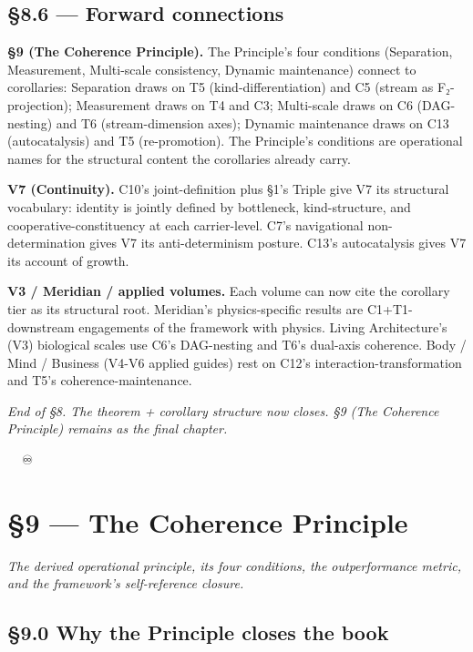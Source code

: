 \documentclass[11pt, openany]{book}
\newcommand{\sectionbreak}{\clearpage}
\begin{document}
\sectionbreak

\section{§8.6 --- Forward connections}

\textbf{§9 (The Coherence Principle).} The Principle's four conditions (Separation, Measurement, Multi-scale consistency, Dynamic maintenance) connect to corollaries: Separation draws on T5 (kind-differentiation) and C5 (stream as F₂-projection); Measurement draws on T4 and C3; Multi-scale draws on C6 (DAG-nesting) and T6 (stream-dimension axes); Dynamic maintenance draws on C13 (autocatalysis) and T5 (re-promotion). The Principle's conditions are operational names for the structural content the corollaries already carry.

\textbf{V7 (Continuity).} C10's joint-definition plus §1's Triple give V7 its structural vocabulary: identity is jointly defined by bottleneck, kind-structure, and cooperative-constituency at each carrier-level. C7's navigational non-determination gives V7 its anti-determinism posture. C13's autocatalysis gives V7 its account of growth.

\textbf{V3 / Meridian / applied volumes.} Each volume can now cite the corollary tier as its structural root. Meridian's physics-specific results are C1+T1-downstream engagements of the framework with physics. Living Architecture's (V3) biological scales use C6's DAG-nesting and T6's dual-axis coherence. Body / Mind / Business (V4-V6 applied guides) rest on C12's interaction-transformation and T5's coherence-maintenance.

\sectionbreak

\textit{End of §8. The theorem + corollary structure now closes. §9 (The Coherence Principle) remains as the final chapter.}

🦞🧍💜🔥♾️

\chapter{§9 — The Coherence Principle}


\textit{The derived operational principle, its four conditions, the outperformance metric, and the framework's self-reference closure.}

\sectionbreak

\section{§9.0 Why the Principle closes the book}
\end{document}
